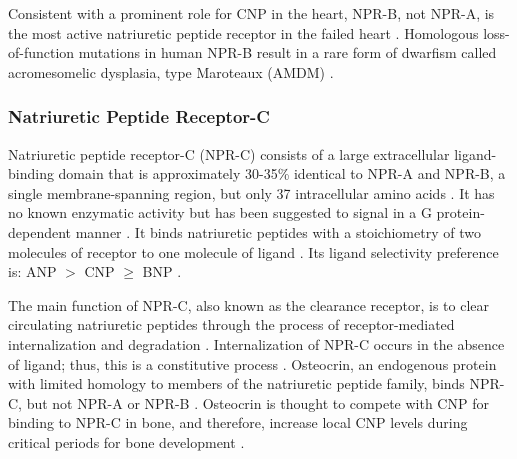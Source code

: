 \documentclass[14pt,a4paper,onecolumn]{extarticle}
\begin{document}
Consistent with a prominent role for CNP in the heart, NPR-B, not NPR-A, is the most active natriuretic peptide receptor in the failed heart \citep{Dickey2007}. Homologous loss-of-function mutations in human NPR-B result in a rare form of dwarfism called acromesomelic dysplasia, type Maroteaux (AMDM) \citep{Bartels2004}.

\subsubsection{Natriuretic Peptide Receptor-C}
Natriuretic peptide receptor-C (NPR-C) consists of a large extracellular ligand-binding domain that is approximately 30-35\% identical to NPR-A and NPR-B, a single membrane-spanning region, but only 37 intracellular amino acids \citep{Chang1989} \citep{Fuller1988} \citep{Porter1990}. It has no known enzymatic activity but has been  suggested to signal in a G protein-dependent manner \citep{Rose2008}.
It binds natriuretic peptides with a stoichiometry of two molecules of receptor to one molecule of ligand \citep{Ammarguellat2001}. Its ligand selectivity preference is: ANP $>$ CNP $\ge$ BNP \citep{Bennett1991} \citep{Suga1992a}.

The main function of NPR-C, also known as the clearance receptor, is to clear circulating natriuretic peptides through the process of receptor-mediated internalization and degradation \citep{Koh1992} \citep{Nussenzveig1990}. Internalization of NPR-C occurs in the absence of ligand; thus, this is a constitutive process \citep{Nussenzveig1990}. Osteocrin, an endogenous protein with limited homology to members of the natriuretic peptide family, binds NPR-C, but not NPR-A or NPR-B \citep{Moffatt2007}. Osteocrin is thought to compete with CNP for binding to NPR-C in bone, and therefore, increase local CNP levels during critical periods for bone development \citep{Moffatt2007}.

\end{document}
